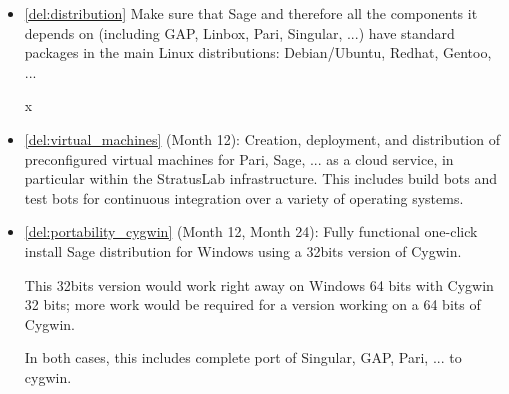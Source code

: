 \begin{Workpackage}{\thewpno}
\begin{WPDeliverables}
\begin{itemize}
\item \ref{del:distribution} Make sure that Sage and therefore all the
  components it depends on (including GAP, Linbox, Pari, Singular,
  ...)  have standard packages in the main Linux distributions:
  Debian/Ubuntu, Redhat, Gentoo, ...


x\item \ref{del:virtual_machines} (Month 12): Creation, deployment, and
  distribution of preconfigured virtual machines for Pari, Sage,
  ... as a cloud service, in particular within the StratusLab
  infrastructure. This includes build bots and test bots for
  continuous integration over a variety of operating systems.

\item \ref{del:portability_cygwin} (Month 12, Month 24): Fully
  functional one-click install Sage distribution for Windows using a
  32bits version of Cygwin.

  This 32bits version would work right away on Windows 64 bits with
  Cygwin 32 bits; more work would be required for a version working on
  a 64 bits of Cygwin.

  In both cases, this includes complete port of Singular, GAP, Pari,
  ...  to cygwin.




\end{itemize}
\end{WPDeliverables}
\end{Workpackage}
